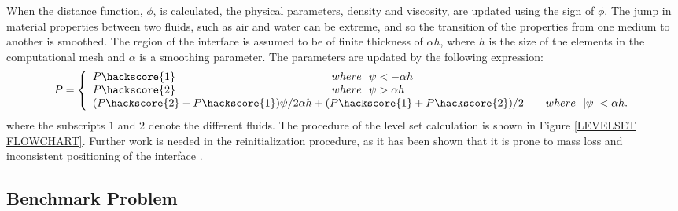 %
When the distance function, $\phi$, is calculated, the physical parameters, density and viscosity, are updated using the sign of $\phi$. The jump in material properties between two fluids, such as air and water can be extreme, and so the transition of the properties from one medium to another is smoothed. The region of the interface is assumed to be of finite thickness of $\alpha h$, where $h$ is the size of the elements in the computational mesh and $\alpha$ is a smoothing parameter. The parameters are updated by the following expression:
%
\begin{equation}
P = 
\left \{ \begin{array}{l}
P\hackscore{1} \hspace{5cm}  where \ \ \psi < - \alpha h \\
P\hackscore{2} \hspace{5cm}  where \ \ \psi > \alpha h \\
(P\hackscore{2} - P\hackscore{1}) \psi/2\alpha h + (P\hackscore{1} + P\hackscore{2})/2 \ \ \ \ \ \ where \ \ |\psi| < \alpha h.
\end{array}
\right.
\label{UPDATE PARAMETERS}
\end{equation} 
%
where the subscripts $1$ and $2$ denote the different fluids. The procedure of the level set calculation is shown in Figure \ref{LEVELSET FLOWCHART}.
Further work is needed in the reinitialization procedure, as it has been shown that it is prone to mass loss and inconsistent positioning of the interface \cite{SUCKALE2008}.

\subsection{Benchmark Problem}

